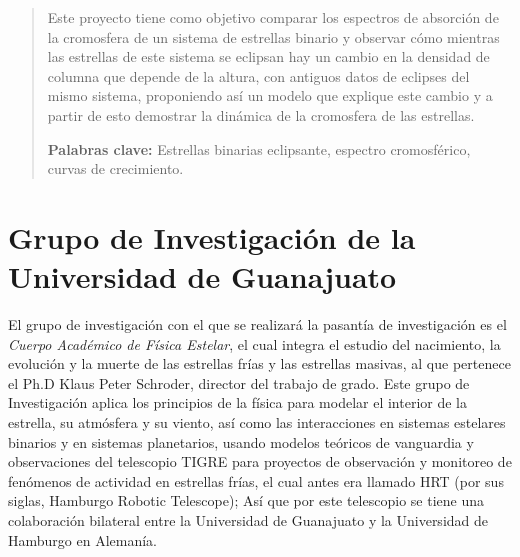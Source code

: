 \documentclass[11pt]{article}
\begin{document}
\newpage
\begin{abstract}
\noindent Este proyecto tiene como objetivo comparar los espectros de absorción de la cromosfera de un sistema de estrellas binario y observar cómo mientras las estrellas de este sistema se eclipsan hay un cambio en la densidad de columna que depende de la altura, con antiguos datos de eclipses del mismo sistema, proponiendo así un modelo que explique este cambio y a partir de esto demostrar la dinámica de la cromosfera de las estrellas.

\vspace{0.5cm}
\textbf{Palabras clave:} Estrellas binarias eclipsante, espectro cromosférico, curvas de crecimiento.

\end{abstract}


\begin{figure}
  \centering

  \label{Figura 1}
\end{figure}


\section{Grupo de Investigación de la Universidad de Guanajuato}
El grupo de investigación con el que se realizará la pasantía de investigación es el \textit{Cuerpo Académico de Física Estelar}, el cual integra el estudio del nacimiento, la evolución y la muerte de las estrellas frías y las estrellas masivas, al que pertenece el Ph.D Klaus Peter Schroder, director del trabajo de grado.  Este grupo de Investigación aplica los principios de la física para modelar el interior de la estrella, su atmósfera y su viento, así como las interacciones en sistemas estelares binarios y en sistemas planetarios, usando modelos teóricos de vanguardia y observaciones del telescopio TIGRE para proyectos de observación y monitoreo de fenómenos de actividad en estrellas frías, el cual antes era llamado HRT (por sus siglas, Hamburgo Robotic Telescope); Así que por este telescopio se tiene una colaboración bilateral entre la Universidad de Guanajuato y la Universidad de Hamburgo en Alemanía.
\end{document}
